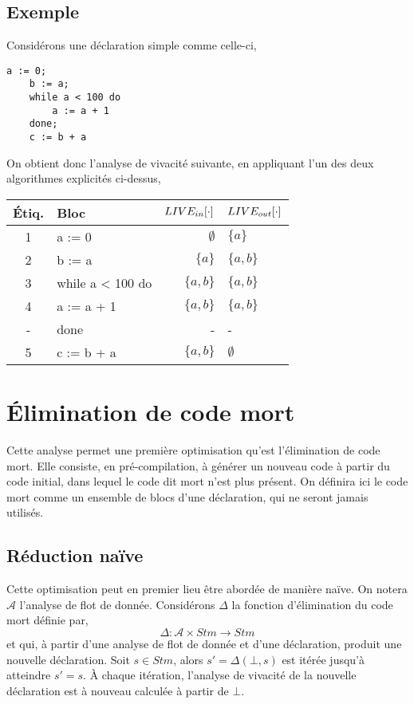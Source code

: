\documentclass[a4paper, 11pt]{article}
\begin{document}
\subsection{Exemple}
\noindent
Considérons une déclaration simple comme celle-ci,
\begin{lstlisting}[tabsize=2]
	a := 0;
	b := a;
	while a < 100 do
		a := a + 1
	done;
	c := b + a
\end{lstlisting}
On obtient donc l'analyse de vivacité suivante, en appliquant l'un des deux algorithmes explicités ci-dessus,
\\
\begin{center}
	\begin{tabular}{||c|l|r|l||}
	\hline
	Étiq. & Bloc & $LIVE_{in}[\cdot]$ & $LIVE_{out}[\cdot]$ \\
	\hline
	1 & a := 0 & $\emptyset$ & $\{a\}$\\
	2 & b := a & $\{a\}$ & $\{a, b\}$\\
	3 & while a < 100 do & $\{a, b\}$ & $\{a, b\}$\\
	4 & a := a + 1 & $\{a, b\}$ & $\{a, b\}$\\
	- & done & - & -\\
	5 & c := b + a & $\{a, b\}$ & $\emptyset$\\
	\hline
	\end{tabular}
\end{center}
\section{Élimination de code mort}
Cette analyse permet une première optimisation qu'est l'élimination de code mort. Elle consiste, en pré-compilation,
à générer un nouveau code à partir du code initial, dans lequel le code dit mort n'est plus présent.
On définira ici le code mort comme un ensemble de blocs d'une déclaration, qui ne seront jamais utilisés.

\subsection{Réduction naïve}
Cette optimisation peut en premier lieu être abordée de manière naïve. On notera $\mathcal{A}$ l'analyse de flot de donnée.
Considérons $\Delta$ la fonction d'élimination du code mort définie par,
\[\Delta : \mathcal{A} \times Stm \longrightarrow Stm\]
et qui, à partir d'une analyse de flot de donnée et d'une déclaration, produit une nouvelle déclaration. Soit $s \in Stm$, alors
$s' = \Delta(\bot, s)$ est itérée jusqu'à atteindre $s' = s$. À chaque itération,
l'analyse de vivacité de la nouvelle déclaration est à nouveau calculée à partir de $\bot$.
\end{document}

